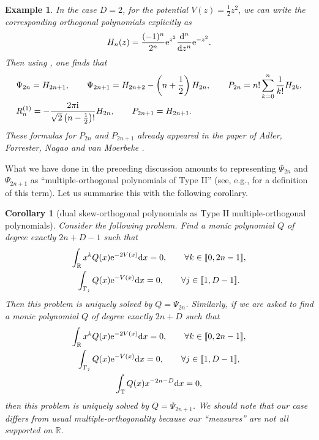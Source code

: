 \documentclass[pdftex]{sigma}
\numberwithin{equation}{section}
\newtheorem{Corollary}[Theorem]{Corollary}
\newtheorem{Example}[Theorem]{Example} }
\begin{document}
\begin{Example}
In the case $D=2$, for the potential $V(z) = \frac{1}{2}z^2$, we can write the corresponding orthogonal polynomials explicitly as
\[%
H_n(z) = \frac{(-1)^n}{2^n} {\rm e}^{z^2} \frac{{\rm d}^n}{{\rm d}z^n} {\rm e}^{-z^2}.
\]
Then using , one finds that
\begin{gather*}
\begin{split}
&\Psi_{2n} = H_{2n+1}, \qquad
\Psi_{2n+1} = H_{2n+2} - \left( n +\frac{1}{2} \right) H_{2n}, \qquad P_{2n} = n! \sum_{k=0}^n \frac{1}{k!} H_{2k}, \\
& R^{(1)}_n = -\frac{2\pi {\rm i} }{ \sqrt{2} \left( n - \frac{1}{2} \right)!} H_{2n},
\qquad
P_{2n+1} = H_{2n+1}.
\end{split}
\end{gather*}
These formulas for $P_{2n}$ and $P_{2n+1}$ already appeared in the paper of Adler, Forrester, Nagao and van Moerbeke \cite{Adler:2000aa}.
\end{Example}
What we have done in the preceding discussion amounts to representing $\Psi_{2n}$ and $\Psi_{2n+1}$ as \enquote{multiple-orthogonal polynomials of Type II} (see, e.g., \cite{Martinez_Finkelshtein_2016} for a definition of this term). Let us summarise this with the following corollary.
\begin{Corollary}[dual skew-orthogonal polynomials as Type II multiple-orthogonal polynomials]\label{typeII} Consider the following problem. Find a monic polynomial $Q$ of degree exactly $2n+D-1$ such that
\begin{gather*}
\int_\mathbb{R} x^k Q(x) {\rm e}^{-2V(x)} {\rm d}x = 0,\qquad\forall k \in [\![ 0, 2n-1]\!], \\
\int_{\Gamma_j} Q(x) {\rm e}^{-V(x)} {\rm d}x = 0,\qquad \forall j \in [\![1, D-1 ]\!].
\end{gather*}
Then this problem is uniquely solved by $Q = \Psi_{2n}$. Similarly, if we are asked to find a monic polynomial $Q$ of degree exactly $2n+D$ such that
\begin{gather*}
\int_\mathbb{R} x^k Q(x) {\rm e}^{-2V(x)} {\rm d}x = 0,\qquad \forall k \in [\![ 0, 2n-1]\!], \\
\int_{\Gamma_j} Q(x) {\rm e}^{-V(x)} {\rm d}x = 0,\qquad \forall j \in [\![1, D-1 ]\!], \\
\int_{\mathbb{T}} Q(x) x^{-2n-D} {\rm d}x = 0,
\end{gather*}
then this problem is uniquely solved by $Q = \Psi_{2n+1}$. We should note that our case differs from usual multiple-orthogonality because our \enquote{measures} are not all supported on $\mathbb{R}$.
\end{Corollary}
\end{document}
